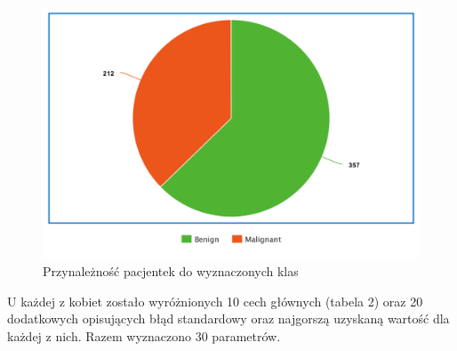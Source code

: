 \documentclass[12pt]{article}
\begin{document}
\begin{figure}[H]
	\centering
		\includegraphics[scale=0.6]{images/pie_chart.png}
	\caption{Przynależność pacjentek do wyznaczonych klas}
\end{figure}

\indent U każdej z kobiet zostało wyróżnionych 10 cech głównych (tabela 2) oraz 20 dodatkowych opisujących błąd standardowy oraz najgorszą uzyskaną wartość dla każdej z nich. Razem wyznaczono 30 parametrów. 
\newline
\end{document}
